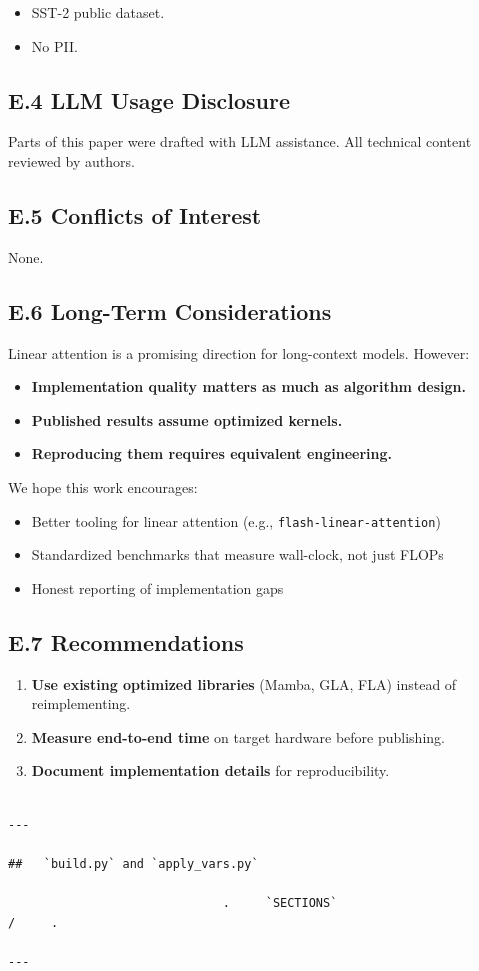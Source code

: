 \begin{itemize}
\item SST-2 public dataset.
\item No PII.

\end{itemize}
\subsection{E.4 LLM Usage Disclosure}

Parts of this paper were drafted with LLM assistance. All technical content 
reviewed by authors.

\subsection{E.5 Conflicts of Interest}

None.

\subsection{E.6 Long-Term Considerations}

Linear attention is a promising direction for long-context models. However:

\begin{itemize}
\item \textbf{Implementation quality matters as much as algorithm design.}
\item \textbf{Published results assume optimized kernels.}
\item \textbf{Reproducing them requires equivalent engineering.}

\end{itemize}
We hope this work encourages:
\begin{itemize}
\item Better tooling for linear attention (e.g., \texttt{flash-linear-attention})
\item Standardized benchmarks that measure wall-clock, not just FLOPs
\item Honest reporting of implementation gaps

\end{itemize}
\subsection{E.7 Recommendations}

\begin{enumerate}
\item \textbf{Use existing optimized libraries} (Mamba, GLA, FLA) instead of
  reimplementing.
\item \textbf{Measure end-to-end time} on target hardware before publishing.
\item \textbf{Document implementation details} for reproducibility.
\end{enumerate}
\begin{lstlisting}

---

##   `build.py` and `apply_vars.py`

                              .     `SECTIONS`                                 /     .

---
\end{lstlisting}